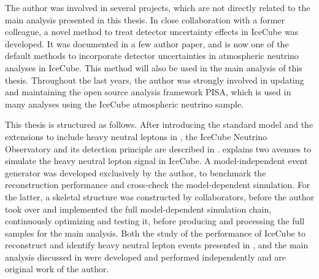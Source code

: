 The author was involved in several projects, which are not directly related to the main analysis presented in this thesis. In close collaboration with a former colleague, a novel method to treat detector uncertainty effects in IceCube was developed. It was documented in a few author paper, and is now one of the default methods to incorporate detector uncertainties in atmospheric neutrino analyses in IceCube. This method will also be used in the main analysis of this thesis. Throughout the last years, the author was strongly involved in updating and maintaining the open source analysis framework PISA, which is used in many analyses using the IceCube atmospheric neutrino sample.

This thesis is structured as follows. After introducing the standard model and the extensions to include heavy neutral leptons in , the IceCube Neutrino Observatory and its detection principle are described in .  explains two avenues to simulate the heavy neutral lepton signal in IceCube. A model-independent event generator was developed exclusively by the author, to benchmark the reconstruction performance and cross-check the model-dependent simulation. For the latter, a skeletal structure was constructed by collaborators, before the author took over and implemented the full model-dependent simulation chain, continuously optimizing and testing it, before producing and processing the full samples for the main analysis. Both the study of the performance of IceCube to reconstruct and identify heavy neutral lepton events presented in , and the main analysis discussed in  were developed and performed independently and are original work of the author.
